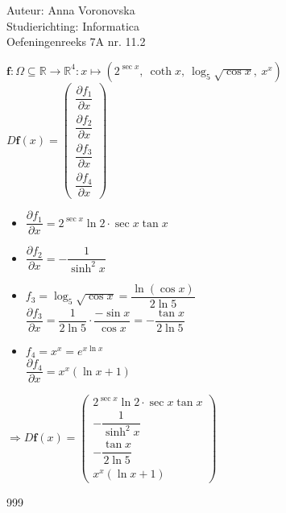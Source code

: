 \documentclass[a4paper]{article}
\begin{document}
  
\noindent \large Auteur: Anna Voronovska \\
\noindent \large Studierichting: Informatica\\
\noindent \large Oefeningenreeks 7A nr. 11.2\\

\medskip

\normalsize

$\mathbf{f} : \Omega \subseteq \mathbb{R} \longrightarrow \mathbb{R}^4 : x \mapsto (2^{\sec x},\ \coth x,\ \log_5\sqrt{\cos x},\ x^x)$\\

$D\mathbf{f}(x) = \left(\begin{array}{c} \dfrac{\partial f_1}{\partial x} \\ \dfrac{\partial f_2}{\partial x} \\ \dfrac{\partial f_3}{\partial x} \\ \dfrac{\partial f_4}{\partial x} \end{array}\right)$\\

\begin{itemize}

\item $\dfrac{\partial f_1}{\partial x} = 2^{\sec x} \ln 2 \cdot \sec x \tan x$\\

\item $\dfrac{\partial f_2}{\partial x} = -\dfrac{1}{\sinh^2 x}$\\

\item $f_3 = \log_5\sqrt{\cos x} = \dfrac{\ln(\cos x)}{2\ln 5}$\\

$\dfrac{\partial f_3}{\partial x} = \dfrac{1}{2\ln 5} \cdot \dfrac{-\sin x}{\cos x} = -\dfrac{\tan x}{2\ln 5}$\\

\item $f_4 = x^x = e^{x\ln x}$\\

$\dfrac{\partial f_4}{\partial x} = x^x(\ln x + 1)$\\

\end{itemize}

$\Rightarrow D\mathbf{f}(x) = \left(\begin{array}{c} 2^{\sec x} \ln 2 \cdot \sec x \tan x \\ -\dfrac{1}{\sinh^2 x} \\
-\dfrac{\tan x}{2\ln 5} \\ x^x(\ln x + 1) \end{array}\right)$\\

\begin{thebibliography}{999}
\end{thebibliography}
\end{document}
